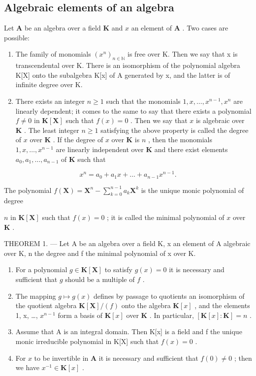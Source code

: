 \subsection{Algebraic elements of an algebra}

Let \(\mathbf{A}\) be an algebra over a field \(\mathbf{K}\) and \(x\) an element of \(\mathbf{A}\) . Two cases are possible:

\begin{enumerate}
\def\labelenumi{\alph{enumi})}
\item
  The family of monomials \((x^{n})_{n\in\mathbb{N}}\) is free over K. Then we say that x is transcendental over K. There is an isomorphism of the polynomial algebra K{[}X{]} onto the subalgebra K{[}x{]} of A generated by x, and the latter is of infinite degree over K.
\item
  There exists an integer \(n \geqslant 1\) such that the monomials \(1, x, \ldots, x^{n-1}, x^n\) are linearly dependent; it comes to the same to say that there exists a polynomial \(f \neq 0\) in \(\mathbf{K}[\mathbf{X}]\) such that \(f(x) = 0\) . Then we say that \(x\) is algebraic over \(\mathbf{K}\) . The least integer \(n \geqslant 1\) satisfying the above property is called the degree of \(x\) over \(\mathbf{K}\) . If the degree of \(x\) over \(\mathbf{K}\) is \(n\) , then the monomials \(1, x, \ldots, x^{n-1}\) are linearly independent over \(\mathbf{K}\) and there exist elements \(a_0, a_1, \ldots, a_{n-1}\) of \(\mathbf{K}\) such that
\end{enumerate}

\[
x ^ {n} = a _ {0} + a _ {1} x + \dots + a _ {n - 1} x ^ {n - 1}.
\]

The polynomial \(f(\mathbf{X}) = \mathbf{X}^n - \sum_{k=0}^{n-1} a_k \mathbf{X}^k\) is the unique monic polynomial of degree

\(n\) in \(\mathbf{K}[\mathbf{X}]\) such that \(f(x) = 0\) ; it is called the minimal polynomial of \(x\) over \(\mathbf{K}\) .

THEOREM 1. --- Let A be an algebra over a field K, x an element of A algebraic over K, n the degree and f the minimal polynomial of x over K.

\begin{enumerate}
\def\labelenumi{\alph{enumi})}
\item
  For a polynomial \(g \in \mathbf{K}[\mathbf{X}]\) to satisfy \(g(x) = 0\) it is necessary and sufficient that \(g\) should be a multiple of \(f\) .
\item
  The mapping \(g \mapsto g(x)\) defines by passage to quotients an isomorphism of the quotient algebra \(\mathbf{K}[\mathbf{X}] / (f)\) onto the algebra \(\mathbf{K}[x]\) , and the elements 1, x, \ldots, \(x^{n-1}\) form a basis of \(\mathbf{K}[x]\) over \(\mathbf{K}\) . In particular, \([\mathbf{K}[x]: \mathbf{K}] = n\) .
\item
  Assume that A is an integral domain. Then K{[}x{]} is a field and f the unique monic irreducible polynomial in K{[}X{]} such that \(f(x) = 0\) .
\item
  For \(x\) to be invertible in \(\mathbf{A}\) it is necessary and sufficient that \(f(0) \neq 0\) ; then we have \(x^{-1} \in \mathbf{K}[x]\) .
\end{enumerate}

